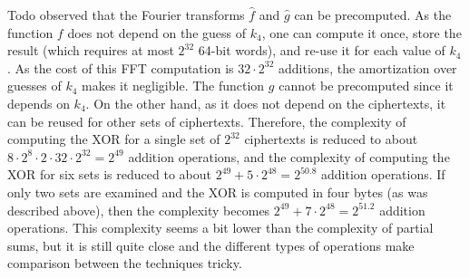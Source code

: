 \enlargethispage{\baselineskip}

Todo observed that the Fourier transforms $\hat{f}$ and $\hat{g}$ can be precomputed. As the function $f$ does not depend on the guess of $k_4$, one can compute it once, store the result (which requires at most $2^{32}$ 64-bit words), and re-use it for each value of $k_4$. As the cost of this FFT computation is $32 \cdot 2^{32}$ additions, the amortization over guesses of $k_4$ makes it negligible. The function $g$ cannot be precomputed since it depends on $k_4$. On the other hand, as it does not depend on the ciphertexts, it can be reused for other sets of ciphertexts. Therefore, the complexity of computing the XOR for a single set of $2^{32}$ ciphertexts is reduced to about $8 \cdot 2^8 \cdot 2 \cdot 32 \cdot 2^{32} = 2^{49}$ addition operations, and the complexity of computing the XOR for six sets is reduced to about $2^{49}+5 \cdot 2^{48} = 2^{50.8}$ addition operations. If only two sets are examined and the XOR is computed in four bytes (as was described above), then the complexity becomes $2^{49}+7 \cdot 2^{48} = 2^{51.2}$ addition operations. This complexity seems a bit lower than the complexity of partial sums, but it is still quite close and the different types of operations make comparison between the techniques tricky.

\iffalse
{}


